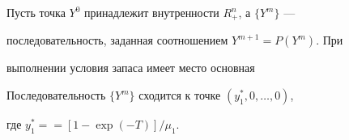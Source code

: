 Пусть точка $Y^0$ принадлежит внутренности $R_+^n$, а $\{Y^m\}$ ---


последовательность, заданная соотношением $Y^{m+1}=P(Y^m)$. При 


выполнении условия запаса имеет место основная





\begin{lems}%


Последовательность $\{Y^m\}$ сходится к точке $(y_1^*,0,\dotsc,0)$, 


где $y_1^*=$\linebreak $=[1-\exp(-T)]/\mu_1$.




\end{lems}%





